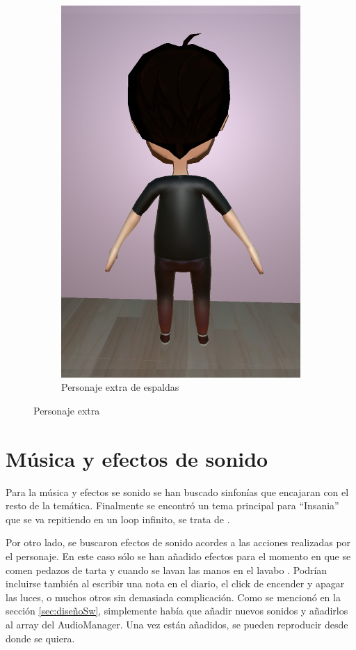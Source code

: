 \documentclass[12pt, a4paper,twoside,titlepage]{book}
\begin{document}
\begin{figure}
\begin{subfigure}{.5\textwidth}
  \includegraphics[width=.95\linewidth]{TGF/Artes/EVIL_back.png}
  \caption{Personaje extra de espaldas}
\end{subfigure}
\caption{Personaje extra}
\label{fig:ArtesEVIL2}
\end{figure}

\section{Música y efectos de sonido}

Para la música y efectos se sonido se han buscado sinfonías que encajaran con el resto de la temática. Finalmente se encontró un tema principal para ``Insania'' que se va repitiendo en un loop infinito, se trata de . 

Por otro lado, se buscaron efectos de sonido acordes a las acciones realizadas por el personaje. En este caso sólo se han añadido efectos para el momento en que se comen pedazos de tarta  y cuando se lavan las manos en el lavabo . Podrían incluirse también al escribir una nota en el diario, el click de encender y apagar las luces, o muchos otros sin demasiada complicación. Como se mencionó en la sección \ref{sec:diseñoSw}, simplemente había que añadir nuevos sonidos y añadirlos al array del AudioManager. Una vez están añadidos, se pueden reproducir desde donde se quiera. 
\end{document}
